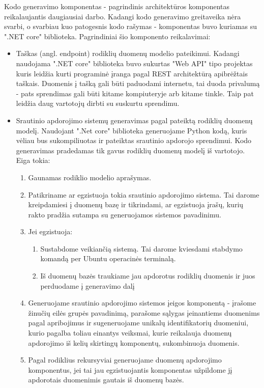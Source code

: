 \documentclass{VUMIFPSbakalaurinis}
\begin{document}
Kodo generavimo komponentas - pagrindinis architektūros komponentas reikalaujantis daugiausiai darbo. Kadangi kodo generavimo greitaveika nėra svarbi, o svarbiau kuo patogesnis kodo rašymas - komponentas buvo kuriamas su ".NET core" biblioteka. 
Pagrindiniai šio komponento reikalavimai:
\begin{itemize}
    \item Taškas (angl. endpoint) rodiklių duomenų modelio pateikimui. Kadangi naudojama ".NET core" biblioteka buvo sukurtas "Web API" tipo projektas kuris leidžia kurti programinė įranga pagal REST architektūrą apibrėžtais taškais. Duomenis į tašką gali būti paduodami internetu, tai duoda privalumą - pats sprendimas gali būti kitame kompiuteryje arb kitame tinkle. Taip pat leidžia daug vartotojų dirbti su suskurtu sprendimu.
    \item Srautinio apdorojimo sistemų generavimas pagal pateiktą rodiklių duomenų modelį. Naudojant ".Net core" biblioteka generuojame Python kodą, kuris vėliau bus sukompiliuotas ir pateiktas srautinio apdorojo sprendimui. Kodo generavimas pradedamas tik gavus rodiklių duomenų modelį iš vartotojo. Eiga tokia:
    \begin{enumerate}
        \item Gaunamas rodiklio modelio aprašymas.
        \item Patikriname ar egzistuoja tokia srautinio apdorojimo sistema. Tai darome kreipdamiesi į duomenų bazę ir tikrindami, ar egzistuoja įrašų, kurių rakto pradžia sutampa su generuojamos sistemos pavadinimu.
        \item Jei egzistuoja:
            \begin{enumerate}
                \item Sustabdome veikiančią sistemą. Tai darome kviesdami stabdymo komandą per Ubuntu operacinės terminalą.
                \item Iš duomenų bazės traukiame jau apdorotus rodiklių duomenis ir juos perduodame į generavimo dalį
            \end{enumerate} 
        \item Generuojame srautinio apdorojimo sistemos įeigos komponentą - įrašome žinučių eilės grupės pavadinimą, parašome sąlygas įeinantiems duomenims pagal apribojimus ir sugeneruojame unikalų identifikatorių duomeniui, kurio pagalba toliau einantys veiksmai, kurie reikalauja duomenų apdorojimo iš kelių skirtingų komponentų, sukombinuoja duomenis.
        \item Pagal rodiklius rekursyviai generuojame duomenų apdorojimo komponentus, jei tai jau egzistuojantis komponentas užpildome jį apdorotais duomenimis gautais iš duomenų bazės. 

\end{enumerate}
\end{itemize}
\end{document}
